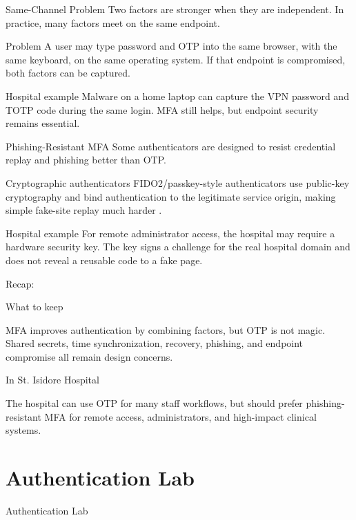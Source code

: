 \documentclass[presentation]{beamer}
\newcommand{\sectiontitleframe}[1]{
\begin{frame}[plain,c]
\begin{center}
{\usebeamerfont{title}\usebeamercolor[fg]{title}#1}
\end{center}
\end{frame}
}
\newcommand{\scenario}{St. Isidore Hospital}
\newcommand{\takeawaysframe}[2]{
  \begin{frame}[c]{Recap: \insertsection}
    \begin{block}{What to keep}
      #1
    \end{block}
    \begin{exampleblock}{In \scenario}
      #2
    \end{exampleblock}
  \end{frame}
}
\begin{document}
\begin{frame}[c]{Same-Channel Problem}
  Two factors are stronger when they are independent. In practice, many factors meet on the same endpoint.

  \begin{block}{Problem}
    A user may type password and OTP into the same browser, with the same keyboard, on the same operating system. If that endpoint is compromised, both factors can be captured.
  \end{block}

  \begin{exampleblock}{Hospital example}
    Malware on a home laptop can capture the VPN password and TOTP code during the same login. MFA still helps, but endpoint security remains essential.
  \end{exampleblock}
\end{frame}

\begin{frame}[c]{Phishing-Resistant MFA}
  Some authenticators are designed to resist credential replay and phishing better than OTP.

  \begin{block}{Cryptographic authenticators}
    FIDO2/passkey-style authenticators use public-key cryptography and bind authentication to the legitimate service origin, making simple fake-site replay much harder \cite{fido2,nist80063b4}.
  \end{block}

  \begin{exampleblock}{Hospital example}
    For remote administrator access, the hospital may require a hardware security key. The key signs a challenge for the real hospital domain and does not reveal a reusable code to a fake page.
  \end{exampleblock}
\end{frame}

\takeawaysframe{
  MFA improves authentication by combining factors, but OTP is not magic. Shared secrets, time synchronization, recovery, phishing, and endpoint compromise all remain design concerns.
}{
  The hospital can use OTP for many staff workflows, but should prefer phishing-resistant MFA for remote access, administrators, and high-impact clinical systems.
}

\section{Authentication Lab}
\sectiontitleframe{Authentication Lab}
\end{document}
